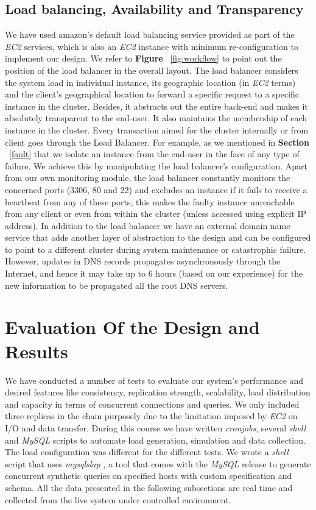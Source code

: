 \documentclass[12pt]{article}
\begin{document}
\subsection{Load balancing, Availability and Transparency}
\label{lb.a.t} We have
used amazon's default load balancing service provided as part of the \emph{EC2}
services, which is also an \emph{EC2} instance with minimum re-configuration to
implement our design. We refer to \textbf{Figure }~\ref{fig:workflow} to point
out the position of the load balancer in the overall layout. The load balancer
considers the system load in individual instance, its geographic location (in
\emph{EC2} terms) and the client's geographical location to forward a specific
request to a specific instance in the cluster. Besides, it abstracts out the
entire back-end and makes it absolutely transparent to the end-user. It also
maintains the membership of each instance in the cluster. Every transaction
aimed for the cluster internally or from client goes through the Load Balancer.
For example, as we mentioned in \textbf{Section }~\ref{fault} that we isolate an
instance from the end-user in the face of any type of failure. We achieve this
by manipulating the load balancer's configuration. Apart from our own monitoring
module, the load balancer constantly monitors the concerned ports (3306, 80 and
22) and excludes an instance if it fails to receive a heartbeat from any of
these ports, this makes the faulty instance unreachable from any client or even
from within the cluster (unless accessed using explicit IP address). In addition
to the load balancer we have an external domain name service that adds another
layer of abstraction to the design and can be configured to point to a different
cluster during system maintenance or catastrophic failure. However, updates in
DNS records propagates asynchronously through the Internet, and hence it may
take up to 6 hours (based on our experience) for the new information to be
propagated all the root DNS servers.

\section{Evaluation Of the Design and Results} We have conducted a number of
tests to evaluate our system's performance and desired features like consistency,
replication strength, scalability, load distribution and capacity in terms of
concurrent connections and queries. We only included three replicas in the chain
purposely due to the limitation imposed by \emph{EC2} \cite{freetier} on I/O and
data transfer. During this course we have written \emph{cronjobs}, several \emph{shell} and
\emph{MySQL} scripts to automate load generation, simulation and data
collection. The load configuration was different for the different tests. We
wrote a \emph{shell} script that uses \emph{mysqlslap} \cite{mysqlslap}, a tool
that comes with the \emph{MySQL} release to generate concurrent synthetic queries on
specified hosts with custom specification and schema. All the data presented in
the following subsections are real time and collected from the live system under
controlled environment.  
\end{document}
